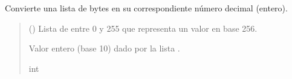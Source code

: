 \documentclass[letterpaper,10pt,english]{sphinxmanual}
\begin{document}
\begin{fulllineitems}
\label{\detokenize{fpga.interfaz_pcps:fpga.interfaz_pcps.bytestr_to_int}}
\pysigstartsignatures
{}
\pysigstopsignatures
\sphinxAtStartPar
Convierte una lista de bytes en su correspondiente número decimal (entero).
\begin{quote}\begin{description}
\sphinxAtStartPar
{} () \textendash{} Lista de  entre 0 y 255 que representa un valor en base 256.

\sphinxAtStartPar
Valor entero (base 10) dado por la lista .

\sphinxAtStartPar
int

\end{description}\end{quote}

\end{fulllineitems}

\end{document}
